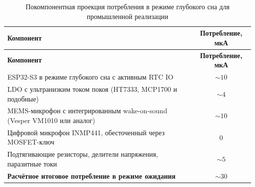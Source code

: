 \begin{longtable}{|p{6.5cm}|c|}
	\caption{Покомпонентная проекция потребления в режиме глубокого сна для промышленной реализации}
	\label{tab:industrial_budget}                                                                        \\
	\hline
	\textbf{Компонент}                                                       & \textbf{Потребление, мкА} \\
	\hline
	\endfirsthead
	\hline
	\textbf{Компонент}                                                       & \textbf{Потребление, мкА} \\
	\hline
	\endhead
	\hline
	\endfoot
	ESP32-S3 в режиме глубокого сна с активным RTC IO~\cite{src:9}           & $\sim 10$                 \\ \hline
	LDO с ультранизким током покоя (HT7333, MCP1700 и подобные)              & $\sim 4$                  \\ \hline
	MEMS-микрофон с интегрированным wake-on-sound (Vesper VM1010 или аналог) & $\sim 10$                 \\ \hline
	Цифровой микрофон INMP441, обесточенный через MOSFET-ключ                & 0                         \\ \hline
	Подтягивающие резисторы, делители напряжения, паразитные токи            & $\sim 5$                  \\ \hline
	\textbf{Расчётное итоговое потребление в режиме ожидания}                & \textbf{$\sim 30$}        \\
	\hline
\end{longtable}
